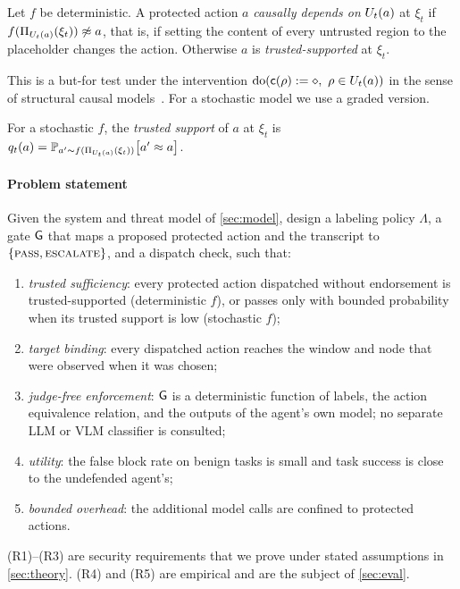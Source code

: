 \begin{definition}\label{def:causal}
Let $f$ be deterministic. A protected action $a$ \emph{causally depends on} $U_t(a)$ at $\xi_t$ if $f(\Pi_{U_t(a)}(\xi_t))\not\approx a$, that is, if setting the content of every untrusted region to the placeholder changes the action. Otherwise $a$ is \emph{trusted-supported} at $\xi_t$.
\end{definition}

This is a but-for test under the intervention $\mathrm{do}(\cont(\rho):=\masked,\ \rho\in\U_t(a))$ in the sense of structural causal models~\cite{pearl2009causality}. For a stochastic model we use a graded version.

\begin{definition}\label{def:support}
For a stochastic $f$, the \emph{trusted support} of $a$ at $\xi_t$ is $q_t(a)=\mathbb{P}_{a'\sim f(\Pi_{U_t(a)}(\xi_t))}\bigl[a'\approx a\bigr]$.
\end{definition}

\paragraph{Problem statement}
Given the system and threat model of \cref{sec:model}, design a labeling policy $\Lambda$, a gate $\mathsf{G}$ that maps a proposed protected action and the transcript to $\{\textsc{pass},\textsc{escalate}\}$, and a dispatch check, such that:
\begin{enumerate}[label=(R\arabic*)]
  \item \emph{trusted sufficiency}: every protected action dispatched without endorsement is trusted-supported (deterministic $f$), or passes only with bounded probability when its trusted support is low (stochastic $f$);
  \item \emph{target binding}: every dispatched action reaches the window and node that were observed when it was chosen;
  \item \emph{judge-free enforcement}: $\mathsf{G}$ is a deterministic function of labels, the action equivalence relation, and the outputs of the agent's own model; no separate LLM or VLM classifier is consulted;
  \item \emph{utility}: the false block rate on benign tasks is small and task success is close to the undefended agent's;
  \item \emph{bounded overhead}: the additional model calls are confined to protected actions.
\end{enumerate}
(R1)--(R3) are security requirements that we prove under stated assumptions in \cref{sec:theory}. (R4) and (R5) are empirical and are the subject of \cref{sec:eval}.

